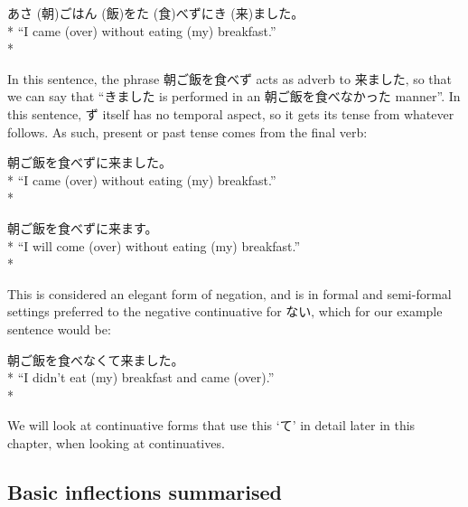 \documentclass[11pt, b5paper, twoside, openright, onecolumn]{book}
\makeatletter
\newcommand*{\rubystack}[2]{{\relscale{0.5}%
  \begin{tabular}[b]{@{}c@{}}%
    {#1}\\%
   {\textscale{2}{#2}}%
  \end{tabular}}%
}
\DeclareRobustCommand*{\ruby}[2]{%
  \mbox{%
    \setlength{\parskip}{0ex}%
    \BeginAccSupp{method=pdfstringdef,ActualText={#1}}%
      \rubystack{\phantom{#2}}{#1}%
      \llap{%
        \rubystack{#2}{\phantom{#1}}%
      }%
    \EndAccSupp{}%
  }%
}
\renewcommand*{\ruby}[2]{#2 (#1)}%
\newenvironment{exampleblock}{
\setlength{\parindent}{0.6in}
\begin{minipage}[t]{\dimexpr\textwidth-\parindent}}
{\end{minipage}}
\makeatother
\begin{document}
\vspace{0.4cm}
\begin{exampleblock}
\ruby{朝}{あさ}ご\ruby{飯}{はん}を\ruby{食}{た}べずに\ruby{来}{き}ました。 \\* 
“I came (over) without eating (my) breakfast.” \\* 
\end{exampleblock}
\vspace{0.2cm}

In this sentence‚ the phrase 朝ご飯を食べず acts as adverb to 来ました‚ so that we can say that “きました is performed in an 朝ご飯を食べなかった manner”. In this sentence‚ ず itself has no temporal aspect‚ so it gets its tense from whatever follows. As such‚ present or past tense comes from the final verb:

\vspace{0.4cm}
\begin{exampleblock}
朝ご飯を食べずに来ました。 \\* 
“I came (over) without eating (my) breakfast.” \\* 
\end{exampleblock}
\vspace{0.2cm}

\begin{exampleblock}
朝ご飯を食べずに来ます。 \\* 
“I will come (over) without eating (my) breakfast.” \\* 
\end{exampleblock}
\vspace{0.2cm}

This is considered an elegant form of negation‚ and is in formal and semi-formal settings preferred to the negative continuative for ない‚ which for our example sentence would be:

\vspace{0.4cm}
\begin{exampleblock}
朝ご飯を食べなくて来ました。 \\* 
“I didn’t eat (my) breakfast and came (over).” \\* 
\end{exampleblock}
\vspace{0.2cm}

We will look at continuative forms that use this ‘て’ in detail later in this chapter‚ when looking at continuatives.

\subsection{Basic inflections summarised}
\end{document}
